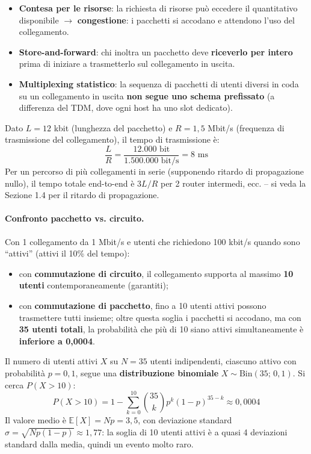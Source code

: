 \documentclass[12pt, a4paper]{article}
\begin{document}
\begin{itemize}
    \item \textbf{Contesa per le risorse}: la richiesta di risorse può eccedere il quantitativo disponibile $\rightarrow$ \textbf{congestione}: i pacchetti si accodano e attendono l'uso del collegamento.
    \item \textbf{Store-and-forward}: chi inoltra un pacchetto deve \textbf{riceverlo per intero} prima di iniziare a trasmetterlo sul collegamento in uscita.
    \item \textbf{Multiplexing statistico}: la sequenza di pacchetti di utenti diversi in coda su un collegamento in uscita \textbf{non segue uno schema prefissato} (a differenza del TDM, dove ogni host ha uno slot dedicato).
\end{itemize}

\begin{tcolorbox}[colback=orange!5, colframe=orange!70!black, title=\textbf{Esempio 1.3 -- Ritardo di trasmissione (store-and-forward)}]
Dato $L=12$ kbit (lunghezza del pacchetto) e $R=1{,}5$ Mbit/s (frequenza di trasmissione del collegamento), il tempo di trasmissione è:
$$\frac{L}{R} = \frac{12.000 \text{ bit}}{1.500.000 \text{ bit/s}} = 8 \text{ ms}$$
Per un percorso di più collegamenti in serie (supponendo ritardo di propagazione nullo), il tempo totale end-to-end è $3L/R$ per 2 router intermedi, ecc. -- si veda la Sezione 1.4 per il ritardo di propagazione.
\end{tcolorbox}

\paragraph{Confronto pacchetto vs. circuito.}
Con 1 collegamento da 1 Mbit/s e utenti che richiedono 100 kbit/s quando sono ``attivi'' (attivi il 10\% del tempo):
\begin{itemize}
    \item con \textbf{commutazione di circuito}, il collegamento supporta al massimo \textbf{10 utenti} contemporaneamente (garantiti);
    \item con \textbf{commutazione di pacchetto}, fino a 10 utenti attivi possono trasmettere tutti insieme; oltre questa soglia i pacchetti si accodano, ma con \textbf{35 utenti totali}, la probabilità che più di 10 siano attivi simultaneamente è \textbf{inferiore a 0,0004}.
\end{itemize}

\begin{tcolorbox}[colback=cyan!5, colframe=blue!40!black, title=\textbf{Possibile domanda orale -- Come si ottiene il valore 0,0004?}]
Il numero di utenti attivi $X$ su $N=35$ utenti indipendenti, ciascuno attivo con probabilità $p=0{,}1$, segue una \textbf{distribuzione binomiale} $X \sim \text{Bin}(35;\,0{,}1)$. Si cerca $P(X>10)$:
$$P(X > 10) = 1 - \sum_{k=0}^{10} \binom{35}{k} p^k (1-p)^{35-k} \approx 0{,}0004$$
Il valore medio è $\mathbb{E}[X] = Np = 3{,}5$, con deviazione standard $\sigma = \sqrt{Np(1-p)} \approx 1{,}77$: la soglia di 10 utenti attivi è a quasi 4 deviazioni standard dalla media, quindi un evento molto raro.
\end{tcolorbox}
\end{document}
